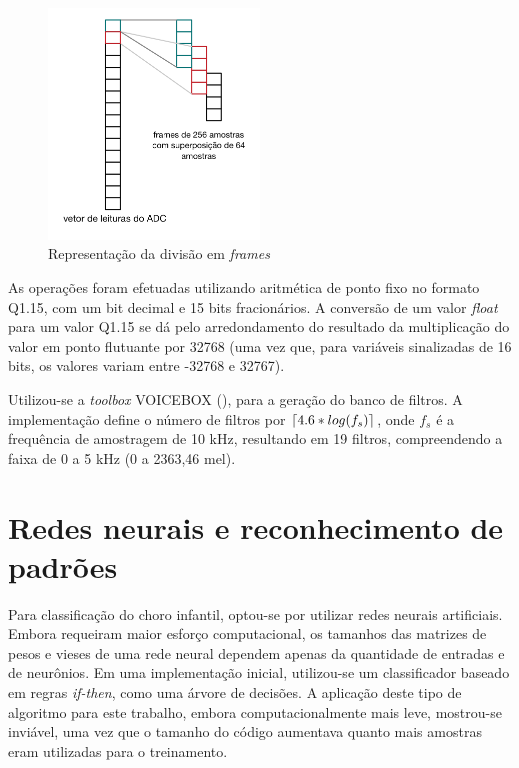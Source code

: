 \documentclass[10pt,a4paper]{article}
\DeclarePairedDelimiter\ceil{\lceil}{\rceil}
\begin{document}
\begin{multicols*}{2}
\begin{figure}[H]
	\centering\includegraphics[width=0.5\textwidth]{../Diagramas/FramesMFCC}
	\caption{Representação da divisão em \textit{frames}}
	\label{fig:frames}
\end{figure}


As operações foram efetuadas utilizando aritmética de ponto fixo no formato Q1.15, com um bit decimal e 15 bits fracionários. A conversão de um valor \textit{float} para um valor Q1.15 se dá pelo arredondamento do resultado da multiplicação do valor em ponto flutuante por 32768 (uma vez que, para variáveis sinalizadas de 16 bits, os valores variam entre -32768 e 32767).

Utilizou-se a \textit{toolbox} VOICEBOX (\cite{voicebox}), para a geração do banco de filtros. A implementação define o número de filtros por $ \ceil*{4.6*log(f_s)} $, onde $f_s$ é a frequência de amostragem de 10 kHz, resultando em 19 filtros, compreendendo a faixa de 0 a 5 kHz (0 a 2363,46 mel).
			
\section{Redes neurais e reconhecimento de padrões}

Para classificação do choro infantil, optou-se por utilizar redes neurais artificiais. Embora requeiram maior esforço computacional, os tamanhos das matrizes de pesos e vieses de uma rede neural dependem apenas da quantidade de entradas e de neurônios. Em uma implementação inicial, utilizou-se um classificador baseado em regras \textit{if-then}, como uma árvore de decisões. A aplicação deste tipo de algoritmo para este trabalho, embora computacionalmente mais leve, mostrou-se inviável, uma vez que o tamanho do código aumentava quanto mais amostras eram utilizadas para o treinamento. 


\end{multicols*}
\end{document}
